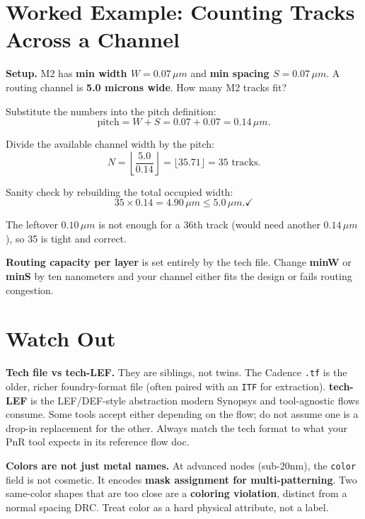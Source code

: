 \section{Worked Example: Counting Tracks Across a Channel}

\textbf{Setup.} M2 has \textbf{min width $W = 0.07\,\mu m$} and \textbf{min spacing $S = 0.07\,\mu m$}. A routing channel is \textbf{5.0 microns wide}. How many M2 tracks fit?

 Substitute the numbers into the pitch definition:
\[
\text{pitch} = W + S = 0.07 + 0.07 = 0.14\,\mu m.
\]

 Divide the available channel width by the pitch:
\[
N = \left\lfloor \frac{5.0}{0.14} \right\rfloor = \lfloor 35.71 \rfloor = 35 \text{ tracks}.
\]

 Sanity check by rebuilding the total occupied width:
\[
35 \times 0.14 = 4.90\,\mu m \le 5.0\,\mu m. \checkmark
\]

 The leftover $0.10\,\mu m$ is not enough for a 36th track (would need another $0.14\,\mu m$), so 35 is tight and correct.

\begin{keyidea}
\textbf{Routing capacity per layer} is set entirely by the tech file. Change \textbf{minW} or \textbf{minS} by ten nanometers and your channel either fits the design or fails routing congestion.
\end{keyidea}

\section{Watch Out}

\begin{pitfall}
\textbf{Tech file vs tech-LEF.} They are siblings, not twins. The Cadence \texttt{.tf} is the older, richer foundry-format file (often paired with an \texttt{ITF} for extraction). \textbf{tech-LEF} is the LEF/DEF-style abstraction modern Synopsys and tool-agnostic flows consume. Some tools accept either depending on the flow; do not assume one is a drop-in replacement for the other. Always match the tech format to what your PnR tool expects in its reference flow doc.
\end{pitfall}

\begin{pitfall}
\textbf{Colors are not just metal names.} At advanced nodes (sub-20nm), the \texttt{color} field is not cosmetic. It encodes \textbf{mask assignment for multi-patterning}. Two same-color shapes that are too close are a \textbf{coloring violation}, distinct from a normal spacing DRC. Treat color as a hard physical attribute, not a label.
\end{pitfall}

